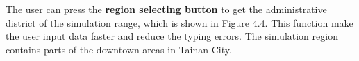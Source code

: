 \documentclass[12pt]{ksthesis}
\begin{document}
\begin{thesis}
{The user can press the \textbf{region selecting button} to get the administrative district of the simulation range, which is shown in Figure 4.4. This function make the user input data faster and reduce the typing errors. The simulation region contains parts of the downtown areas in Tainan City. 


\begin{figure}[H]
\centering  %


\end{figure}}
\end{thesis}
\end{document}
